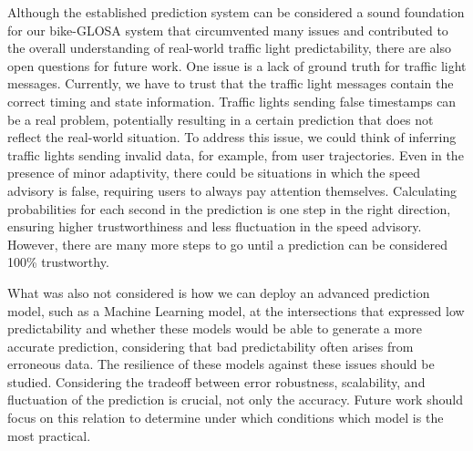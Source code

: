 Although the established prediction system can be considered a sound foundation for our bike-GLOSA system that circumvented many issues and contributed to the overall understanding of real-world traffic light predictability, there are also open questions for future work. One issue is a lack of ground truth for traffic light messages. Currently, we have to trust that the traffic light messages contain the correct timing and state information. Traffic lights sending false timestamps can be a real problem, potentially resulting in a certain prediction that does not reflect the real-world situation. To address this issue, we could think of inferring traffic lights sending invalid data, for example, from user trajectories. Even in the presence of minor adaptivity, there could be situations in which the speed advisory is false, requiring users to always pay attention themselves. Calculating probabilities for each second in the prediction is one step in the right direction, ensuring higher trustworthiness and less fluctuation in the speed advisory. However, there are many more steps to go until a prediction can be considered 100\% trustworthy.

What was also not considered is how we can deploy an advanced prediction model, such as a Machine Learning model, at the intersections that expressed low predictability and whether these models would be able to generate a more accurate prediction, considering that bad predictability often arises from erroneous data. The resilience of these models against these issues should be studied. Considering the tradeoff between error robustness, scalability, and fluctuation of the prediction is crucial, not only the accuracy. Future work should focus on this relation to determine under which conditions which model is the most practical.
